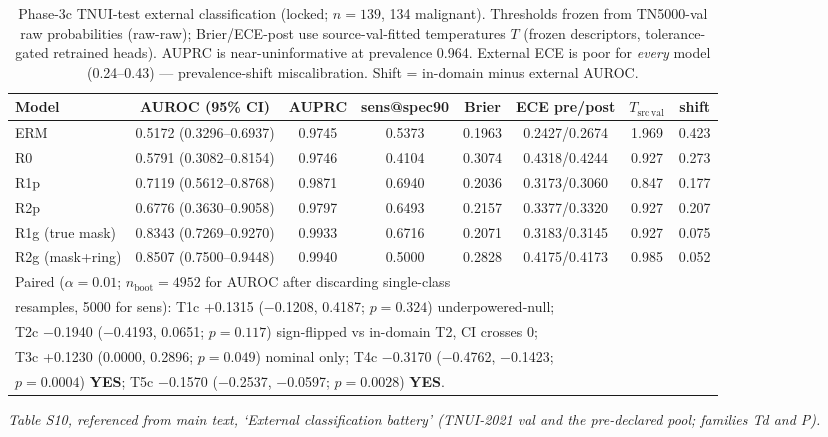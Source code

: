 \documentclass[11pt]{article}
\begin{document}
\begin{table}[!ht]
\centering\scriptsize
\setlength{\tabcolsep}{3pt}
\caption{Phase-3c TNUI-test external classification (locked; $n{=}139$, 134
malignant). Thresholds frozen from TN5000-val raw probabilities (raw-raw);
Brier/ECE-post use source-val-fitted temperatures $T$ (frozen descriptors,
tolerance-gated retrained heads). AUPRC is near-uninformative at prevalence
0.964. External ECE is poor for \emph{every} model (0.24--0.43) ---
prevalence-shift miscalibration. Shift = in-domain minus external AUROC.}
\label{tab:phase3c}
\begin{tabular}{lccccccc}
\toprule
Model & AUROC (95\% CI) & AUPRC & sens@spec90 & Brier & ECE pre/post & $T_{\mathrm{src\,val}}$ & shift \\
\midrule
ERM            & 0.5172 (0.3296--0.6937) & 0.9745 & 0.5373 & 0.1963 & 0.2427/0.2674 & 1.969 & 0.423 \\
R0             & 0.5791 (0.3082--0.8154) & 0.9746 & 0.4104 & 0.3074 & 0.4318/0.4244 & 0.927 & 0.273 \\
R1p            & 0.7119 (0.5612--0.8768) & 0.9871 & 0.6940 & 0.2036 & 0.3173/0.3060 & 0.847 & 0.177 \\
R2p            & 0.6776 (0.3630--0.9058) & 0.9797 & 0.6493 & 0.2157 & 0.3377/0.3320 & 0.927 & 0.207 \\
R1g (true mask)      & 0.8343 (0.7269--0.9270) & 0.9933 & 0.6716 & 0.2071 & 0.3183/0.3145 & 0.927 & 0.075 \\
R2g (mask+ring)      & 0.8507 (0.7500--0.9448) & 0.9940 & 0.5000 & 0.2828 & 0.4175/0.4173 & 0.985 & 0.052 \\
\midrule
\multicolumn{8}{l}{Paired ($\alpha{=}0.01$; $n_{\mathrm{boot}}{=}4952$ for AUROC after discarding single-class}\\
\multicolumn{8}{l}{resamples, 5000 for sens): T1c +0.1315 ($-$0.1208, 0.4187; $p{=}0.324$) underpowered-null;}\\
\multicolumn{8}{l}{T2c $-$0.1940 ($-$0.4193, 0.0651; $p{=}0.117$) sign-flipped vs in-domain T2, CI crosses 0;}\\
\multicolumn{8}{l}{T3c +0.1230 (0.0000, 0.2896; $p{=}0.049$) nominal only; T4c $-$0.3170 ($-$0.4762, $-$0.1423;}\\
\multicolumn{8}{l}{$p{=}0.0004$) \textbf{YES}; T5c $-$0.1570 ($-$0.2537, $-$0.0597; $p{=}0.0028$) \textbf{YES}.}
\end{tabular}
\end{table}

\noindent\emph{Table S10, referenced from main text, `External classification battery' (TNUI-2021 val and the pre-declared pool; families Td and P).}
\end{document}
